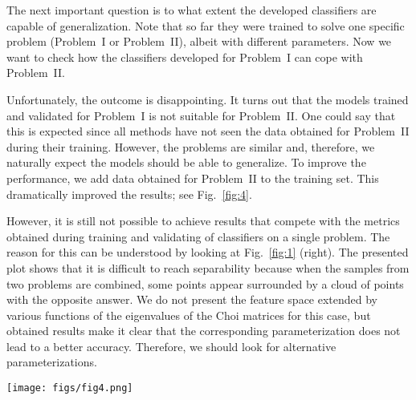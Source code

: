 \documentclass[%
 aip,
 floatfix,
 amsmath,amssymb,
 reprint,%
]{revtex4-1}
\begin{document}
The next important question  is to what extent the developed classifiers are capable of generalization. Note that so far they were trained to solve one specific problem (Problem~I or Problem~II), albeit with different  parameters. Now we want to check how the classifiers developed for Problem~I can cope with Problem~II.

Unfortunately, the outcome is disappointing. It turns out that the models trained and validated for Problem~I is not suitable for Problem~II. One could say that this is expected since all methods have not seen the data obtained for Problem~II during their training. However, the problems are  similar and, therefore, we naturally expect the models should be able to generalize. To improve the performance, we add data obtained for Problem~II to the training set. This dramatically improved the results; see Fig.~\ref{fig:4}.

However, it is still not possible to achieve results that compete with the metrics obtained during training and validating of classifiers on a single problem. The reason for this  can be understood by looking at Fig.~\ref{fig:1} (right). The presented plot shows that it is difficult to reach separability because when the samples from two problems are combined, some points appear surrounded by a cloud of points with the opposite answer. We do not present the feature space extended by various functions of the eigenvalues of the Choi matrices for this case, but obtained results make it clear that the corresponding parameterization does not lead to a better accuracy. Therefore, we should look for alternative parameterizations.

\begin{figure*}[h]
\texttt{[image: figs/fig4.png]}
\caption{
Classification accuracy for datasets of Choi eigenvalues (blue) and of their functions,  square roots and fourth-order roots (red). Datasets were generated for Problem I. Additionally, we train and test models with mixed datasets consisting of the data for both problems, I and II (green). The accuracy is quantified by using three different measures (see Section VA). The center of a diagram corresponds to accuracy $0.4$.} \label{fig:4}
\end{figure*}
\end{document}

